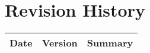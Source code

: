 \section*{Revision History}

\begin{table}[h]
  \centering
  \begin{tabularx}{\textwidth}{|l|l|X|}
    \hline
    \rowcolor{iob-green}
             {\bf Date} & {\bf Version} & {\bf Summary} \\ \hline
             
  \end{tabularx}
\end{table}
